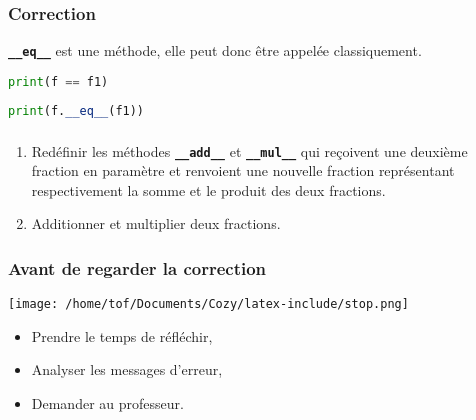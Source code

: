 \documentclass[svgnames,11pt]{beamer}
\begin{document}
\begin{frame}[fragile]
    \frametitle{Correction}

    \begin{aretenir}[Remarque]
\textbf{\texttt{\_\_eq\_\_}} est une méthode, elle peut donc être appelée classiquement.
\begin{center}
\begin{lstlisting}[language=Python , basicstyle=\ttfamily\small, xleftmargin=2em, xrightmargin=1em]
print(f == f1)
\end{lstlisting}
\begin{lstlisting}[language=Python , basicstyle=\ttfamily\small, xleftmargin=2em, xrightmargin=1em]
print(f.__eq__(f1))
\end{lstlisting}
\label{CODE}
\end{center}
    \end{aretenir}

\end{frame}
\begin{frame}
    \frametitle{}

    \begin{activite}
        \begin{enumerate}
            \item Redéfinir les méthodes \textbf{\texttt{\_\_add\_\_}} et \textbf{\texttt{\_\_mul\_\_}} qui reçoivent une deuxième fraction en paramètre et renvoient une nouvelle fraction représentant respectivement la somme et le produit des deux
        fractions.
        \item Additionner et multiplier deux fractions.
        \end{enumerate}
    \end{activite}

\end{frame}
\begin{frame}
    \frametitle{Avant de regarder la correction}
\begin{center}
    \centering
    \texttt{[image: /home/tof/Documents/Cozy/latex-include/stop.png]}
    \end{center}
{\Large
    \begin{itemize}
        \item Prendre le temps de réfléchir,
        \item Analyser les messages d'erreur,
        \item Demander au professeur.
    \end{itemize}
}
\end{frame}
\end{document}
